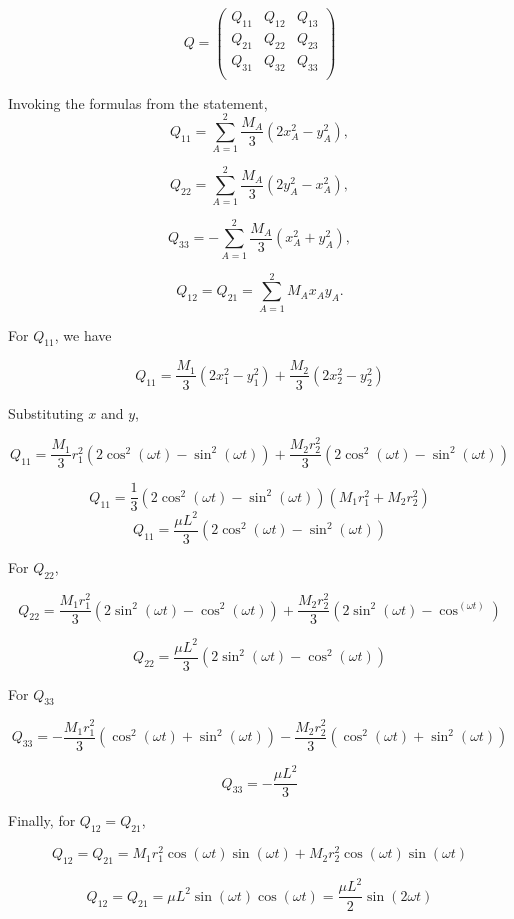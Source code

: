 \documentclass[11pt]{article}
\begin{document}
\begin{pproblem}
\begin{pssolution*}{}{}
\begin{alternativas}
        \[Q = \left(\begin{matrix}
            Q_{11} & Q_{12} & Q_{13} \\
            Q_{21} & Q_{22} & Q_{23} \\
            Q_{31} & Q_{32} & Q_{33} \\
        \end{matrix}\right)\]

        Invoking the formulas from the statement,
        \[
        Q_{11} = \sum_{A=1}^2 \frac{M_A}{3} \left( 2x_A^2 - y_A^2 \right),
        \]

        \[
        Q_{22} = \sum_{A=1}^2 \frac{M_A}{3} \left( 2y_A^2 - x_A^2 \right),
        \]

        \[
        Q_{33} = -\sum_{A=1}^2 \frac{M_A}{3} \left( x_A^2 + y_A^2 \right),
        \]

        \[
        Q_{12} = Q_{21} = \sum_{A=1}^2 M_A x_A y_A.
        \]

         For \(Q_{11}\), we have

        \[Q_{11} = \frac{M_1}{3}(2x_1^2-y_1^2) + \frac{M_2}{3}(2x_2^2-y_2^2)\]

        Substituting \(x\) and \(y\),

        \[Q_{11} = \frac{M_1}{3}r_1^2(2\cos^2(\omega t) - \sin^2(\omega t)) + \frac{M_2r^2_2}{3}(2\cos^2(\omega t) - \sin^2(\omega t))\]

        \[Q_{11} = \frac{1}{3}(2\cos^2(\omega t) - \sin^2(\omega t))(M_1r_1^2 + M_2r_2^2)\]  
        \[Q_{11} = \frac{\mu L^2}{3}(2\cos^2(\omega t) - \sin^2(\omega t))\]

        For \(Q_{22}\),

        \[Q_{22} = \frac{M_1r_1^2}{3}(2\sin^2(\omega t) - \cos^2(\omega t)) + \frac{M_2r_2^2}{3}(2\sin^2(\omega t) - \cos^(\omega t))\]

        \[Q_{22} = \frac{\mu L^2}{3}(2\sin^2(\omega t) - \cos^2(\omega t))\]


        For \(Q_{33}\)

        \[Q_{33} = -\frac{M_1r_1^2}{3}(\cos^2(\omega t) + \sin^2(\omega t))-\frac{M_2r_2^2}{3}(\cos^2(\omega t) + \sin^2(\omega t))\]

        \[Q_{33} = -\frac{\mu L^2}{3}\]

        Finally, for \(Q_{12} = Q_{21}\),

        \[Q_{12} = Q_{21} = M_1r_1^2\cos(\omega t) \sin(\omega t) + M_2r_2^2\cos(\omega t)\sin(\omega t)\]

        \[Q_{12} = Q_{21} = \mu L^2 \sin(\omega t)\cos(\omega t) = \frac{\mu L^2}{2}\sin(2\omega t)\]


\end{alternativas}
\end{pssolution*}
\end{pproblem}
\end{document}
